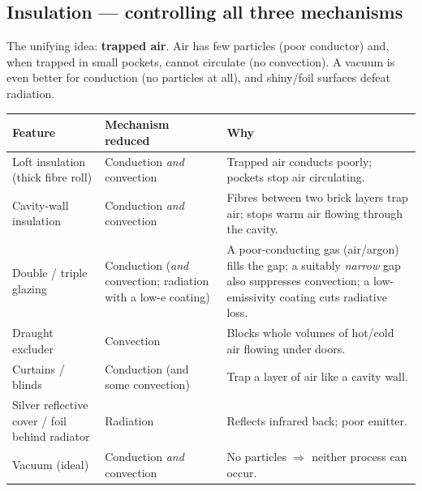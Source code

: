 \documentclass[11pt,a4paper]{article}
\begin{document}
\subsection{Insulation --- controlling all three mechanisms}

The unifying idea: \textbf{trapped air}. Air has few particles (poor conductor) and, when
trapped in small pockets, cannot circulate (no convection). A vacuum is even better for
conduction (no particles at all), and shiny/foil surfaces defeat radiation.

\begin{center}
\renewcommand{\arraystretch}{1.3}
\begin{tabular}{@{}p{4.6cm}p{4.4cm}p{5.2cm}@{}}
\toprule
\textbf{Feature} & \textbf{Mechanism reduced} & \textbf{Why} \\
\midrule
Loft insulation (thick fibre roll) & Conduction \emph{and} convection & Trapped air
conducts poorly; pockets stop air circulating. \\
Cavity-wall insulation & Conduction \emph{and} convection & Fibres between two brick
layers trap air; stops warm air flowing through the cavity. \\
Double / triple glazing & Conduction (\emph{and} convection; radiation with a low-e
coating) & A poor-conducting gas (air/argon) fills the gap; a suitably \emph{narrow} gap
also suppresses convection; a low-emissivity coating cuts radiative loss. \\
Draught excluder & Convection & Blocks whole volumes of hot/cold air flowing under doors. \\
Curtains / blinds & Conduction (and some convection) & Trap a layer of air like a cavity
wall. \\
Silver reflective cover / foil behind radiator & Radiation & Reflects infrared back;
poor emitter. \\
Vacuum (ideal) & Conduction \emph{and} convection & No particles $\Rightarrow$ neither
process can occur. \\
\bottomrule
\end{tabular}
\end{center}

\begin{center}
\end{center}
\end{document}
